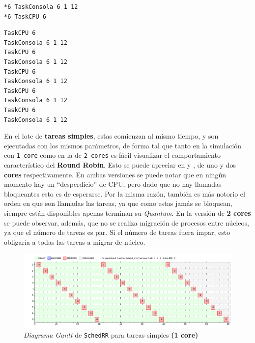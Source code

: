 \documentclass[11pt, a4paper, twoside]{article}
\begin{document}
\begin{minipage}{0.4\textwidth}
\begin{Verbatim}[frame=single,framesep=1cm,label=interactivas2.tsk]
*6 TaskConsola 6 1 12
*6 TaskCPU 6
\end{Verbatim}
\end{minipage}
\hfill
\begin{minipage}{0.4\textwidth}
\begin{Verbatim}[frame=single,framesep=1cm,label=interactivas\_intercaladas.tsk]
TaskCPU 6
TaskConsola 6 1 12
TaskCPU 6
TaskConsola 6 1 12
TaskCPU 6
TaskConsola 6 1 12
TaskCPU 6
TaskConsola 6 1 12
TaskCPU 6
TaskConsola 6 1 12
\end{Verbatim}
\end{minipage}

En el lote de \textbf{tareas simples}, estas comienzan al mismo tiempo, y  son
ejecutadas con los mismos parámetros, de forma tal que tanto en la simulación
con \texttt{1 core} como en la de \texttt{2 cores} es fácil visualizar el
comportamiento característico del \textbf{Round Robin}. Esto se puede apreciar
en  y , de uno y dos \textbf{cores}
respectivamente.  En ambas versiones se puede notar que en ningún momento hay un
``desperdicio'' de CPU, pero dado que no hay llamadas bloqueantes esto es de
esperarse. Por la misma razón, también es más notorio el orden en que son
llamadas las tareas, ya que como estas jamás se bloquean, siempre están
disponibles apenas terminan su \emph{Quantum}. En la versión de \textbf{2 cores}
se puede observar, además, que no se realiza migración de procesos entre
núcleos, ya que el número de tareas es par. Si el número de tareas fuera impar,
esto obligaría a todas las tareas a migrar de núcleo.

\begin{figure}
  \centering
  \includegraphics [width=\textwidth]{../graficos/sched_rr/simples-1.png}
  \caption{\emph{Diagrama Gantt} de \texttt{SchedRR} para tareas simples \textbf{(1 core)}}
  \label{fig:gantt-sched-rr-1}
\end{figure}
\end{document}
